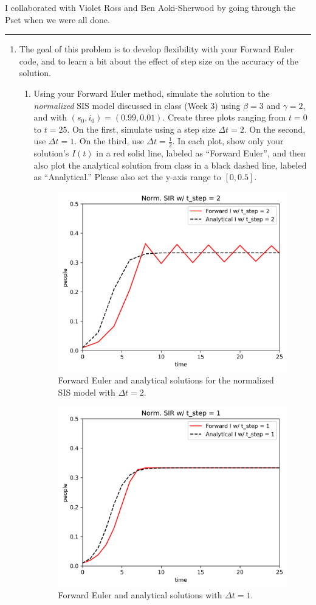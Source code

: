 \documentclass[11pt]{article}
\begin{document}
\renewcommand{\headrulewidth}{0.4pt}

I collaborated with Violet Ross and Ben Aoki-Sherwood by going through the Pset when we were all done.
\vspace{0.1in}\hrule

\begin{enumerate}
	\item The goal of this problem is to develop flexibility with your Forward Euler code, and to learn a bit about the effect of step size on the accuracy of the solution.
	
\begin{enumerate}[label=\alph*.]
	\item Using your Forward Euler method, simulate the solution to the {\it normalized} SIS model discussed in class (Week 3) using $\beta=3$ and $\gamma=2$, and with $(s_0, i_0) = (0.99, 0.01)$. Create three plots ranging from $t=0$ to $t=25$. On the first, simulate using a step size $\Delta t=2$. On the second, use $\Delta t =1$. On the third, use $\Delta t = \tfrac{1}{2}$. In each plot, show only your solution's $I(t)$ in a red solid line, labeled as ``Forward Euler'', and then also plot the analytical solution from class in a black dashed line, labeled as ``Analytical.'' Please also set the y-axis range to $[0,0.5]$. 
	\begin{figure}[H]
		\centering
		\includegraphics[width=0.5\linewidth]{figures/sir_dt2.png}
		\caption{Forward Euler and analytical solutions for the normalized SIS model with $\Delta t = 2$.}
		\label{fig:sir_dt2}
	\end{figure}
	
	\begin{figure}[H]
		\centering
		\includegraphics[width=0.5\linewidth]{figures/sir_dt1.png}
		\caption{Forward Euler and analytical solutions with $\Delta t = 1$.}
		\label{fig:sir_dt1}
	\end{figure}
	

\end{enumerate}
\end{enumerate}
\end{document}

